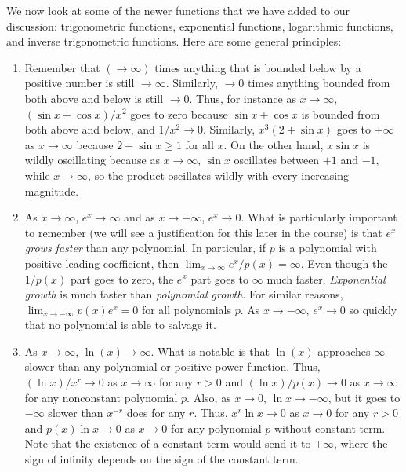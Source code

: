 \documentclass[10pt]{amsart}
\begin{document}
We now look at some of the newer functions that we have added to our
discussion: trigonometric functions, exponential functions,
logarithmic functions, and inverse trigonometric functions. Here are
some general principles:

\begin{enumerate}
\item Remember that $(\to \infty)$ times anything that is bounded
  below by a positive number is still $\to \infty$. Similarly, $\to 0$
  times anything bounded from both above and below is still $\to
  0$. Thus, for instance as $x \to \infty$, $(\sin x + \cos x)/x^2$
  goes to zero because $\sin x + \cos x$ is bounded from both above
  and below, and $1/x^2 \to 0$. Similarly, $x^3(2 + \sin x)$ goes to
  $+\infty$ as $x \to \infty$ because $2 + \sin x \ge 1$ for all
  $x$. On the other hand, $x\sin x$ is wildly oscillating because as
  $x \to \infty$, $\sin x$ oscillates between $+1 $ and $-1$, while $x
  \to \infty$, so the product oscillates wildly with every-increasing
  magnitude.
\item As $x \to \infty$, $e^x \to \infty$ and as $x \to -\infty$, $e^x
  \to 0$. What is particularly important to remember (we will see a
  justification for this later in the course) is that $e^x$ {\em grows
  faster} than any polynomial. In particular, if $p$ is a polynomial
  with positive leading coefficient, then $\lim_{x \to \infty}
  e^x/p(x) = \infty$. Even though the $1/p(x)$ part goes to zero, the
  $e^x$ part goes to $\infty$ much faster. {\em Exponential growth} is
  much faster than {\em polynomial growth}. For similar reasons,
  $\lim_{x \to -\infty} p(x)e^x = 0$ for all polynomials $p$. As $x
  \to -\infty$, $e^x \to 0$ so quickly that no polynomial is able to
  salvage it.
\item As $x \to \infty$, $\ln(x) \to \infty$. What is notable is that
  $\ln(x)$ approaches $\infty$ slower than any polynomial or positive
  power function. Thus, $(\ln x)/x^r \to 0$ as $x \to \infty$ for any
  $r > 0$ and $(\ln x)/p(x) \to 0$ as $x \to \infty$ for any
  nonconstant polynomial $p$. Also, as $x \to 0$, $\ln x \to -\infty$,
  but it goes to $-\infty$ slower than $x^{-r}$ does for any
  $r$. Thus, $x^r \ln x \to 0$ as $x \to 0$ for any $r > 0$ and $p(x)
  \ln x \to 0$ as $x \to 0$ for any polynomial $p$ without constant
  term. Note that the existence of a constant term would send it to
  $\pm \infty$, where the sign of infinity depends on the sign of the
  constant term.
\end{enumerate}
\end{document}
